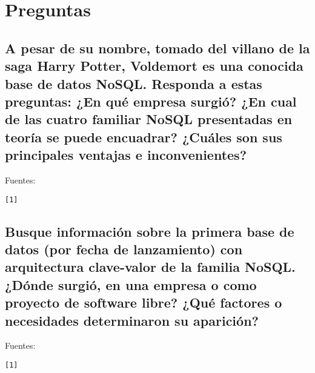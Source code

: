 \documentclass[12pt,a4paper,twoside,openright,titlepage,final]{article}
\author{José Ignacio Escribano}
\title{}
\begin{document}
\setcounter{page}{1}


\tableofcontents
\thispagestyle{empty}
\newpage

\setcounter{page}{1}


\section{Preguntas}

\subsection{A pesar de su nombre, tomado del villano de la saga Harry Potter, Voldemort es una conocida base de datos NoSQL. Responda a estas preguntas: ¿En qué empresa surgió? ¿En cual de las cuatro familiar NoSQL presentadas en teoría se puede encuadrar? ¿Cuáles son sus principales ventajas e inconvenientes?}



Fuentes:\\
\begin{verbatim}
[1] 
\end{verbatim}

\subsection{Busque información sobre la primera base de datos (por fecha de lanzamiento) con arquitectura clave-valor de la familia NoSQL. ¿Dónde surgió, en una empresa o como proyecto de software libre? ¿Qué factores o necesidades determinaron su aparición?}

Fuentes:\\
\begin{verbatim}
[1]
\end{verbatim}
\end{document}
